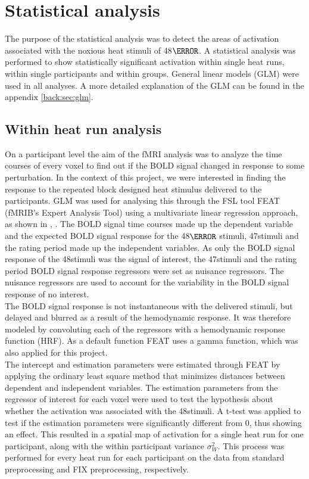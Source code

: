 \section{Statistical analysis} \label{stats}
The purpose of the statistical analysis was to detect the areas of activation associated with the noxious heat stimuli of 48$\degree$. A statistical analysis was performed to show statistically significant activation within single heat runs, within single participants and within groups. General linear models (GLM) were used in all analyses. A more detailed explanation of the GLM can be found in the appendix \ref{back:sec:glm}. 

\subsection{Within heat run analysis}
On a participant level the aim of the fMRI analysis was to analyze the time courses of every voxel to find out if the BOLD signal changed in response to some perturbation. In the context of this project, we were interested in finding the response to the repeated block designed heat stimulus delivered to the participants. GLM was used for analysing this through the FSL tool FEAT (fMRIB’s Expert Analysis Tool) using a multivariate linear regression approach, as shown in , . The BOLD signal time courses made up the dependent variable and the expected BOLD signal response for the 48$\degree$ stimuli, 47\degree stimuli and the rating period made up the independent variables. As only the BOLD signal response of the 48\degree stimuli was the signal of interest, the 47\degree stimuli and the rating period BOLD signal response regressors were set as nuisance regressors. The nuisance regressors are used to account for the variability in the BOLD signal response of no interest. \\
The BOLD signal response is not instantaneous with the delivered stimuli, but delayed and blurred as a result of the hemodynamic response. It was therefore modeled by convoluting each of the regressors with a hemodynamic response function (HRF). As a default function FEAT uses a gamma function, which was also applied for this project. \\
The intercept and estimation parameters were estimated through FEAT by applying the ordinary least square method that minimizes distances between dependent and independent variables. The estimation parameters from the regressor of interest for each voxel were used to test the hypothesis about whether the activation was associated with the 48\degree stimuli. A t-test was applied to test if the estimation parameters were significantly different from 0, thus showing an effect. This resulted in a spatial map of activation for a single heat run for one participant, along with the within participant variance $\sigma_{W}^{2}$. This process was performed for every heat run for each participant on the data from standard preprocessing and FIX preprocessing, respectively. \\

